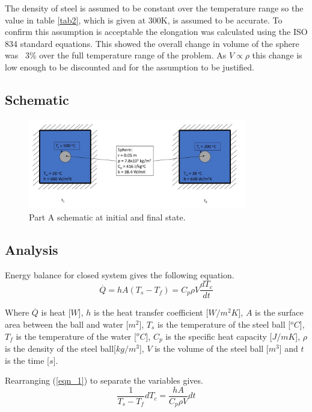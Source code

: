 \documentclass[11pt]{article}
\begin{document}
The density of steel is assumed to be constant over the temperature range so the value in table \ref{tab2}, which is given at 300K, is assumed to be accurate. To confirm this assumption is acceptable the elongation was calculated using the ISO 834 standard equations\cite{jean-marc_franssen_fire_2015}. This showed the overall change in volume of the sphere was ~3\% over the full temperature range of the problem. As $V \propto \rho$ this change is low enough to be discounted and for the assumption to be justified.

\subsection{Schematic}
\begin{figure}[!htbp]
	\centering
	\includegraphics[width=0.85\textwidth]{part_a_fig}
	\caption{Part A schematic at initial and final state.}
	\label{fig:schem_a}
\end{figure}
\FloatBarrier
\subsection{Analysis}

Energy balance for closed system gives the following equation.
\begin{equation}\label{eqn_1}
	\stackrel{.}{Q} = hA(T_{s}-T_{f}) = C_{p}\rho V \frac{dT_{c}}{dt}
\end{equation}

Where $\stackrel{.}{Q}$ is heat [$W$], $h$ is the heat transfer coefficient [$W/m^{2}K$], $A$ is the surface area between the ball and water [$m^{2}$], $T_{s}$ is the temperature of the steel ball [$^{o}C$], $T_{f}$ is the temperature of the water [$^{o}C$], $C_{p}$ is the specific heat capacity [$J/mK$], $\rho$ is the density of the steel ball[$kg/m^{3}$], $V$ is the volume of the steel ball [$m^3$] and $t$ is the time [$s$].
\newline

Rearranging (\ref{eqn_1}) to separate the variables gives.
\begin{equation}\label{key}
	\frac{1}{T_{s}-T_{f}} dT_{c} = \frac{hA}{C_{p}\rho V}dt
\end{equation}
\end{document}
